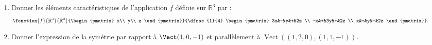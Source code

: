 \begin{enumerate}
\item Donner les éléments caractéristiques de l'application $f$ définie sur $\mathbb R^3$ par :
$$\fonction{f}{\mathbb R^3}{\mathbb R^3}{\begin{pmatrix} x\\ y\\ z \end{pmatrix}}{\dfrac{1}{4} \begin{pmatrix} 3x&-&y&+&2z \\ -x&+&3y&+&2z \\ x&+&y&+&2z \end{pmatrix}}.$$
\item Donner l'expression de la symétrie par rapport à $\Vect(1,0,-1)$ et parallèlement à $\mathop{\mathrm{Vect}}\nolimits\left((1,2,0),(1,1,-1)\right)$.
\end{enumerate}

